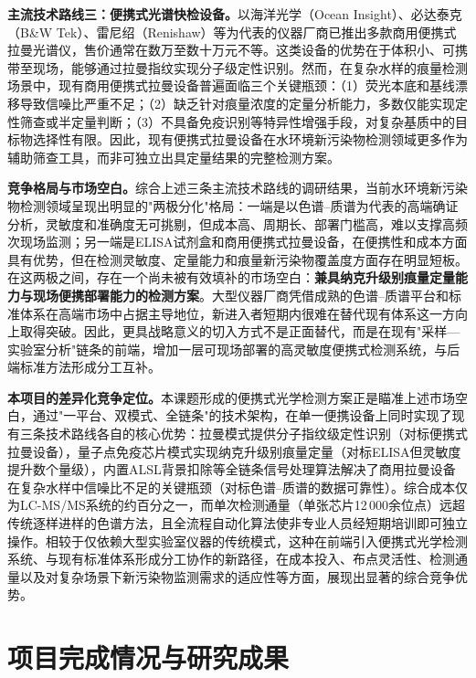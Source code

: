 \documentclass[12pt,a4paper]{article}
\begin{document}
\textbf{主流技术路线三：便携式光谱快检设备。}以海洋光学（Ocean Insight）、必达泰克（B\&W Tek）、雷尼绍（Renishaw）等为代表的仪器厂商已推出多款商用便携式拉曼光谱仪，售价通常在数万至数十万元不等。这类设备的优势在于体积小、可携带至现场，能够通过拉曼指纹实现分子级定性识别。然而，在复杂水样的痕量检测场景中，现有商用便携式拉曼设备普遍面临三个关键瓶颈：（1）荧光本底和基线漂移导致信噪比严重不足；（2）缺乏针对痕量浓度的定量分析能力，多数仅能实现定性筛查或半定量判断；（3）不具备免疫识别等特异性增强手段，对复杂基质中的目标物选择性有限。因此，现有便携式拉曼设备在水环境新污染物检测领域更多作为辅助筛查工具，而非可独立出具定量结果的完整检测方案。

\textbf{竞争格局与市场空白。}综合上述三条主流技术路线的调研结果，当前水环境新污染物检测领域呈现出明显的"两极分化"格局：一端是以色谱--质谱为代表的高端确证分析，灵敏度和准确度无可挑剔，但成本高、周期长、部署门槛高，难以支撑高频次现场监测；另一端是ELISA试剂盒和商用便携式拉曼设备，在便携性和成本方面具有优势，但在检测灵敏度、定量能力和痕量新污染物覆盖度方面存在明显短板。在这两极之间，存在一个尚未被有效填补的市场空白：\textbf{兼具纳克升级别痕量定量能力与现场便携部署能力的检测方案}。大型仪器厂商凭借成熟的色谱--质谱平台和标准体系在高端市场中占据主导地位，新进入者短期内很难在替代现有体系这一方向上取得突破。因此，更具战略意义的切入方式不是正面替代，而是在现有"采样—实验室分析"链条的前端，增加一层可现场部署的高灵敏度便携式检测系统，与后端标准方法形成分工互补。

\textbf{本项目的差异化竞争定位。}本课题形成的便携式光学检测方案正是瞄准上述市场空白，通过"一平台、双模式、全链条"的技术架构，在单一便携设备上同时实现了现有三条技术路线各自的核心优势：拉曼模式提供分子指纹级定性识别（对标便携式拉曼设备），量子点免疫芯片模式实现纳克升级别痕量定量（对标ELISA但灵敏度提升数个量级），内置ALSL背景扣除等全链条信号处理算法解决了商用拉曼设备在复杂水样中信噪比不足的关键瓶颈（对标色谱--质谱的数据可靠性）。综合成本仅为LC-MS/MS系统的约百分之一，而单次检测通量（单张芯片12\,000余位点）远超传统逐样进样的色谱方法，且全流程自动化算法使非专业人员经短期培训即可独立操作。相较于仅依赖大型实验室仪器的传统模式，这种在前端引入便携式光学检测系统、与现有标准体系形成分工协作的新路径，在成本投入、布点灵活性、检测通量以及对复杂场景下新污染物监测需求的适应性等方面，展现出显著的综合竞争优势。

\section{项目完成情况与研究成果}
\end{document}
